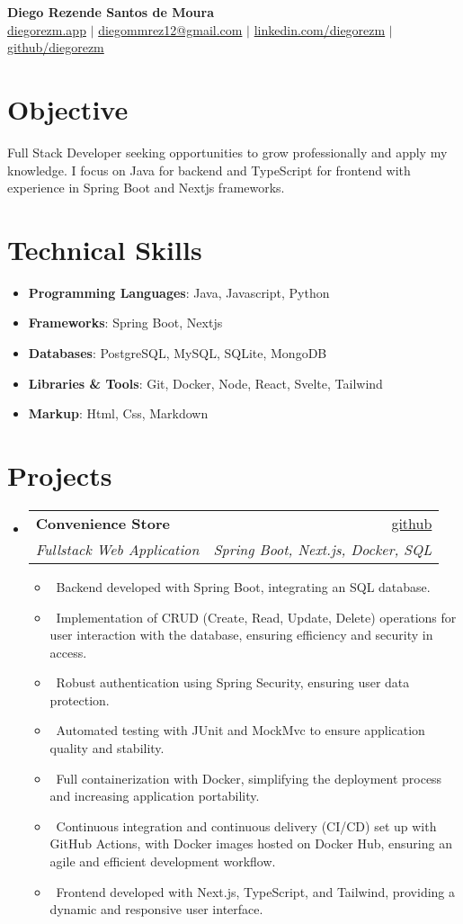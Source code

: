 \documentclass[letterpaper,10pt]{article}
\makeatletter
\newcommand{\resumeItem}[1]{\item\small{#1}}
\newcommand{\resumeSubheading}[4]{
\vspace{-1pt}\item
  \begin{tabular*}{0.97\textwidth}[t]{l@{\extracolsep{\fill}}r}
    \textbf{#1} & #2 \\
    \textit{#3} & \textit{#4} \\
  \end{tabular*}\vspace{-7pt}
}
\newcommand{\resumeSubHeadingList}{\begin{itemize}[leftmargin=0.15in, label={}]}
\newcommand{\resumeSubHeadingListEnd}{\end{itemize}}
\makeatother
\begin{document}
\begin{center}
  \textbf{\Huge Diego Rezende Santos de Moura} \\
  \small \href{https://diegorezm.netlify.app/}{diegorezm.app} $|$ \href{mailto:diegommrez12@gmail.com}{diegommrez12@gmail.com} $|$ 
  \href{https://linkedin.com/in/diegorezm}{linkedin.com/diegorezm} $|$
  \href{https://github.com/diegorezm}{github/diegorezm}
\end{center}

\section*{Objective}
Full Stack Developer seeking opportunities to grow professionally and apply my knowledge. I focus on Java for backend and TypeScript for frontend with experience in Spring Boot and Nextjs frameworks.

\section{Technical Skills}
\resumeSubHeadingList
  \resumeItem{\textbf{Programming Languages}: Java, Javascript, Python}
  \resumeItem{\textbf{Frameworks}: Spring Boot, Nextjs}
    \resumeItem{\textbf{Databases}: PostgreSQL, MySQL, SQLite, MongoDB}
  \resumeItem{\textbf{Libraries \& Tools}: Git, Docker, Node, React, Svelte, Tailwind}
  \resumeItem{\textbf{Markup}: Html, Css, Markdown}
\resumeSubHeadingListEnd

\section{Projects}
\resumeSubHeadingList
  \resumeSubheading
      {Convenience Store}{\href{https://github.com/diegorezm/convenience.store.api}{github}} 
      {Fullstack Web Application}{Spring Boot, Next.js, Docker, SQL}
      \resumeSubHeadingList
          \resumeItem{\textbullet\ Backend developed with Spring Boot, integrating an SQL database.}
          \resumeItem{\textbullet\ Implementation of CRUD (Create, Read, Update, Delete) operations for user interaction with the database, ensuring efficiency and security in access.}
          \resumeItem{\textbullet\ Robust authentication using Spring Security, ensuring user data protection.}
          \resumeItem{\textbullet\ Automated testing with JUnit and MockMvc to ensure application quality and stability.}
          \resumeItem{\textbullet\ Full containerization with Docker, simplifying the deployment process and increasing application portability.}
          \resumeItem{\textbullet\ Continuous integration and continuous delivery (CI/CD) set up with GitHub Actions, with Docker images hosted on Docker Hub, ensuring an agile and efficient development workflow.}
          \resumeItem{\textbullet\ Frontend developed with Next.js, TypeScript, and Tailwind, providing a dynamic and responsive user interface.}
      \resumeSubHeadingListEnd
\resumeSubHeadingListEnd
\end{document}
